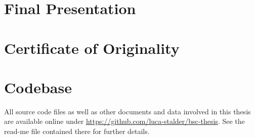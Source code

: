 \documentclass[a4paper,oneside]{csthesis}
\begin{document}
\begin{appendices}
\chapter{Final Presentation}
\chapter{Certificate of Originality}
\chapter{Codebase}
All source code files as well as other documents and data involved in this thesis are available online under \url{https://github.com/luca-stalder/bsc-thesis}. See the read-me file contained there for further details.
\end{appendices}
\end{document}
